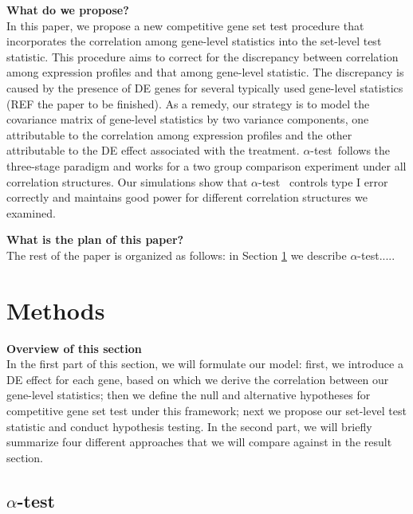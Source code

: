 \documentclass[useAMS,usenatbib, galley]{biom}
\newcommand{\OurMethod}{$\alpha$-test}
\begin{document}
	
	
	\textbf{What do we propose?} \\
	In this paper, we propose a new competitive gene set test procedure that incorporates the correlation among gene-level statistics into the set-level test statistic. This procedure aims to correct for the discrepancy between correlation among expression profiles and that among gene-level statistic. The discrepancy is caused by the presence of DE genes for several typically used gene-level statistics (REF the paper to be finished). As a remedy, our strategy is to model the covariance matrix of gene-level statistics by two variance components, one attributable to the correlation among expression profiles and the other attributable to the DE effect associated with the treatment. \OurMethod~follows the three-stage paradigm and works for a two group comparison experiment under all correlation structures. Our simulations show that \OurMethod~ controls type I error correctly and maintains good power for different correlation structures we examined. 
	
	\textbf{What is the plan of this paper?} \\
	The rest of the paper is organized as follows: in Section \ref{section:methods} we describe \OurMethod.....
	
	
	
	\section{Methods}\label{section:methods}
	\textbf{Overview of this section} \\
	In the first part of this section, we will formulate our model: first, we introduce a DE effect for each gene, based on which we derive the correlation between our gene-level statistics; then we define the null and alternative hypotheses for competitive gene set test under this framework; next we propose our set-level test statistic and conduct hypothesis testing. In the second part, we will briefly summarize four different approaches that we will compare against in the result section.  
	
	\subsection{\OurMethod}
\end{document}
